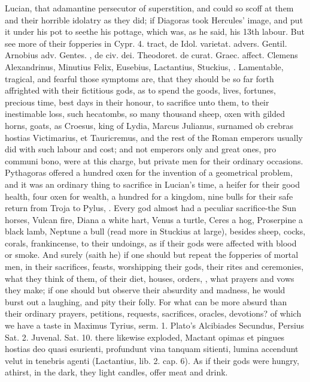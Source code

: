 {Lucian, that adamantine persecutor of superstition, and \Pliny{}
could so scoff at them and their horrible idolatry as they did; if
Diagoras took Hercules' image, and put it under his pot to seethe his
pottage, which was, as he said, his 13th labour. But see more of their
fopperies in Cypr. 4. tract, de Idol. varietat. \Chrysostom{} advers.
Gentil. Arnobius adv. Gentes. \Austin{}, de civ. dei. Theodoret. de curat.
Graec. affect. Clemens Alexandrinus, Minutius Felix, Eusebius,
Lactantius, Stuckius, \etc{}. Lamentable, tragical, and fearful those
symptoms are, that they should be so far forth affrighted with their
fictitious gods, as to spend the goods, lives, fortunes, precious time,
best days in their honour, to sacrifice unto them, to their
inestimable loss, such hecatombs, so many thousand sheep, oxen with
gilded horns, goats, as Croesus, king of Lydia,  Marcus
Julianus, surnamed ob crebras hostias Victimarius, et Tauricremus, and
the rest of the Roman emperors usually did with such labour and cost;
and not emperors only and great ones, pro communi bono, were at this
charge, but private men for their ordinary occasions. Pythagoras
offered a hundred oxen for the invention of a geometrical problem, and
it was an ordinary thing to sacrifice in Lucian's time, a heifer
for their good health, four oxen for wealth, a hundred for a kingdom,
nine bulls for their safe return from Troja to Pylus, \etc{}. Every god
almost had a peculiar sacrifice-the Sun horses, Vulcan fire, Diana a
white hart, Venus a turtle, Ceres a hog, Proserpine a black lamb,
Neptune a bull (read more in  Stuckius at large), besides sheep,
cocks, corals, frankincense, to their undoings, as if their gods were
affected with blood or smoke. And surely (saith he) if one should
but repeat the fopperies of mortal men, in their sacrifices, feasts,
worshipping their gods, their rites and ceremonies, what they think of
them, of their diet, houses, orders, \etc{}, what prayers and vows they
make; if one should but observe their absurdity and madness, he would
burst out a laughing, and pity their folly. For what can be more absurd
than their ordinary prayers, petitions, requests, sacrifices,
oracles, devotions? of which we have a taste in Maximus Tyrius, serm.
1. Plato's Alcibiades Secundus, Persius Sat. 2. Juvenal. Sat. 10. there
likewise exploded, Mactant opimas et pingues hostias deo quasi
esurienti, profundunt vina tanquam sitienti, lumina accendunt velut in
tenebris agenti (Lactantius, lib. 2. cap. 6). As if their gods were
hungry, athirst, in the dark, they light candles, offer meat and drink.

}
